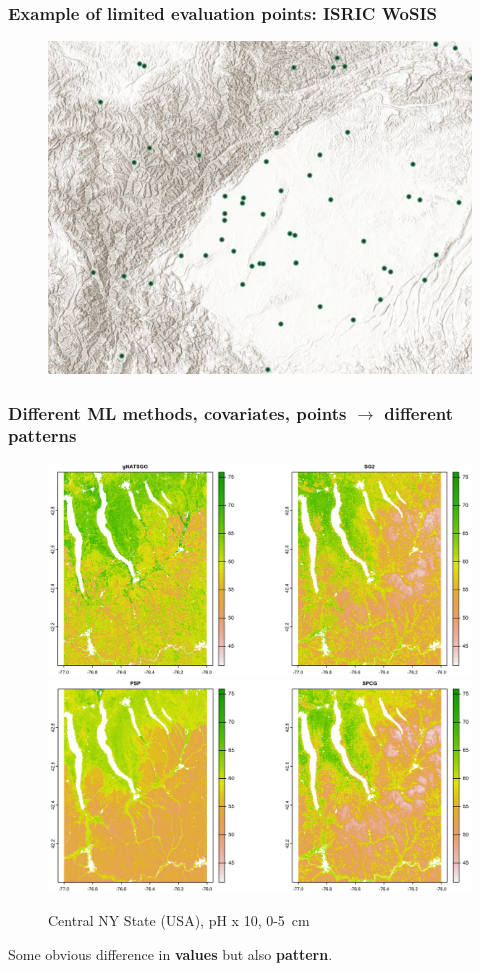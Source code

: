 \documentclass[aspectratio=169, 10pt]{beamer}
\begin{document}
\begin{frame}
  \frametitle{Example of limited evaluation points: ISRIC WoSIS}
\begin{figure}
    \centering
\includegraphics[height=0.7\textheight]{./graphics_david/SoilGridsProfiles_Chengdu.png}
\end{figure}
\end{frame}

\begin{frame}
  \frametitle{Different ML methods, covariates,  points $\to$ different patterns}
    \begin{figure}
        \includegraphics[width=0.49\linewidth]{./graphics_david/Fig07a.png}
        \includegraphics[width=0.49\linewidth]{./graphics_david/Fig07b.png}
\par        
{\hfill        
        {Central NY State (USA), pH x 10, 0-5~cm} \hfill}
    \end{figure}
 Some obvious difference in \textbf{values} but also \textbf{pattern}.
\end{frame}
\end{document}
